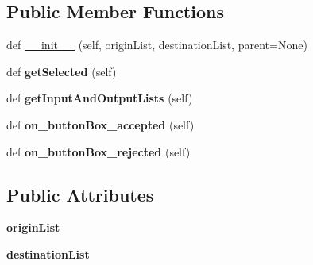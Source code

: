 \subsection*{Public Member Functions}
\begin{DoxyCompactItemize}
\item 
def \mbox{\hyperlink{class_dsg_tools_1_1_custom_widgets_1_1list_selector_1_1_list_selector_a6d5400e462b4218203dc18f41b2ecbf4}{\+\_\+\+\_\+init\+\_\+\+\_\+}} (self, origin\+List, destination\+List, parent=None)
\item 
\mbox{\label{class_dsg_tools_1_1_custom_widgets_1_1list_selector_1_1_list_selector_a8071366206f44a9fb379fbde58f0f6b3}} 
def {\bfseries get\+Selected} (self)
\item 
\mbox{\label{class_dsg_tools_1_1_custom_widgets_1_1list_selector_1_1_list_selector_aae091491485ab0401a0ab1a850709eb7}} 
def {\bfseries get\+Input\+And\+Output\+Lists} (self)
\item 
\mbox{\label{class_dsg_tools_1_1_custom_widgets_1_1list_selector_1_1_list_selector_a8229e2aa66b66e51c2237cabe064f64c}} 
def {\bfseries on\+\_\+button\+Box\+\_\+accepted} (self)
\item 
\mbox{\label{class_dsg_tools_1_1_custom_widgets_1_1list_selector_1_1_list_selector_a9d8cf26e7306226f0a6a08bfebebcd44}} 
def {\bfseries on\+\_\+button\+Box\+\_\+rejected} (self)
\end{DoxyCompactItemize}
\subsection*{Public Attributes}
\begin{DoxyCompactItemize}
\item 
\mbox{\label{class_dsg_tools_1_1_custom_widgets_1_1list_selector_1_1_list_selector_ac5a83e554a5825c25b9ea02ab6285e49}} 
{\bfseries origin\+List}
\item 
\mbox{\label{class_dsg_tools_1_1_custom_widgets_1_1list_selector_1_1_list_selector_a1b3ef14d6889328f97941562d302bdd5}} 
{\bfseries destination\+List}
\end{DoxyCompactItemize}


